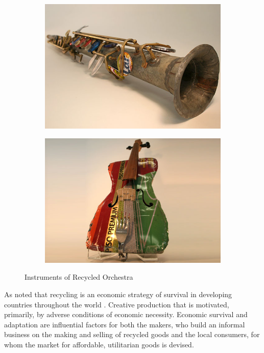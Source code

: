 \begin{figure}
  \begin{subfigure}[b]{0.48\textwidth}
    \includegraphics[width=\textwidth]{graphics/landfill_harmonic-sax.jpg}
    \label{fig:landfill_harmonic-sax}
  \end{subfigure}
  \hfill
  \begin{subfigure}[b]{0.48\textwidth}
    \includegraphics[width=\textwidth]{graphics/landfill_harmonic-violin.jpg}
    \label{fig:landfill_harmonic-violin}
  \end{subfigure}
  \caption{Instruments of Recycled Orchestra}
  \label{fig:landfill_harmonic}
\end{figure}

As noted that recycling is an economic strategy of survival in developing countries throughout the world \citep[25]{cerny1996recycled}. Creative production that is motivated, primarily, by adverse conditions of economic necessity. Economic survival and adaptation are influential factors for both the makers, who build an informal business on the making and selling of recycled goods and the local consumers, for whom the market for affordable, utilitarian goods is devised. 

